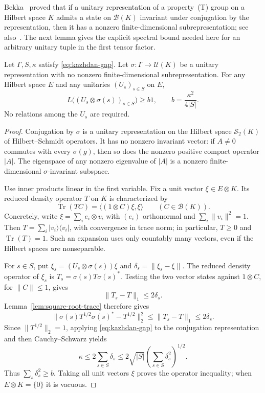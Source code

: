 Bekka~\cite{Bekka1990} proved that if a unitary representation of a
property~(T) group on a Hilbert space $K$ admits a state on
$\mathcal B(K)$ invariant under conjugation by the representation,
then it has a nonzero finite-dimensional subrepresentation; see
also~\cite[proof of Proposition~2]{Valette1997}. The next lemma gives
the explicit spectral bound needed here for an arbitrary unitary tuple
in the first tensor factor.

\begin{lemma}
\label{lem:weak-mixing-bound}
Let $\Gamma,S,\kappa$ satisfy \eqref{eq:kazhdan-gap}. Let
$\sigma:\Gamma\to\mathcal U(K)$ be a unitary representation with no
nonzero finite-dimensional subrepresentation. For any Hilbert space $E$
and any unitaries $(U_s)_{s\in S}$ on $E$,
\[
 L\bigl((U_s\otimes\sigma(s))_{s\in S}\bigr)\geq b1,
 \qquad b=\frac{\kappa^2}{4|S|}.
\]
No relations among the $U_s$ are required.
\end{lemma}

\begin{proof}
Conjugation by $\sigma$ is a unitary representation on the Hilbert space
$\mathcal S_2(K)$ of Hilbert--Schmidt operators. It has no nonzero invariant
vector: if $A\neq0$ commutes with every $\sigma(g)$, then so does the
nonzero positive compact operator $|A|$. The eigenspace of any nonzero
eigenvalue of $|A|$ is a nonzero finite-dimensional $\sigma$-invariant
subspace.

Use inner products linear in the first variable. Fix a unit vector
$\xi\in E\otimes K$. Its reduced density operator
$T$ on $K$ is characterized by
\[
 \operatorname{Tr}(TC)=\langle(1\otimes C)\xi,\xi\rangle
 \qquad(C\in\mathcal B(K)).
\]
Concretely, write $\xi=\sum_i e_i\otimes v_i$ with $(e_i)$ orthonormal
and $\sum_i\|v_i\|^2=1$. Then
$T=\sum_i |v_i\rangle\langle v_i|$, with convergence in trace norm;
in particular, $T\geq0$ and $\operatorname{Tr}(T)=1$. Such an expansion
uses only countably many vectors, even if the Hilbert spaces are
nonseparable.

For $s\in S$, put $\xi_s=(U_s\otimes\sigma(s))\xi$ and
$\delta_s=\|\xi_s-\xi\|$. The reduced density operator of $\xi_s$ is
$T_s=\sigma(s)T\sigma(s)^*$. Testing the two vector states against
$1\otimes C$, for $\|C\|\leq1$, gives
\[
 \|T_s-T\|_1\leq2\delta_s.
\]
Lemma~\ref{lem:square-root-trace} therefore gives
\[
 \|\sigma(s)T^{1/2}\sigma(s)^*-T^{1/2}\|_2^2
 \leq\|T_s-T\|_1\leq2\delta_s.
\]
Since $\|T^{1/2}\|_2=1$, applying \eqref{eq:kazhdan-gap} to the
conjugation representation and then Cauchy--Schwarz yields
\[
 \kappa\leq2\sum_{s\in S}\delta_s
 \leq2\sqrt{|S|}\left(\sum_{s\in S}\delta_s^2\right)^{1/2}.
\]
Thus $\sum_s\delta_s^2\geq b$. Taking all unit vectors $\xi$ proves
the operator inequality; when $E\otimes K=\{0\}$ it is vacuous.
\end{proof}

